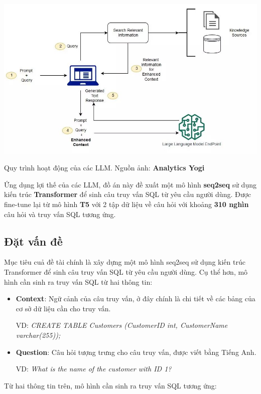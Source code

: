 \documentclass[a4paper, 10pt]{article}
\begin{document}
\begin{minipage}{\linewidth}
    \captionsetup{type=figure}
    \centering
    \includegraphics[width=14cm]{./llm.jpg}
    \caption{Quy trình hoạt động của các LLM. Nguồn ảnh: \textbf{Analytics Yogi}}
\end{minipage}

Ứng dụng lợi thế của các LLM, đồ án này đề xuất một mô hình \textbf{seq2seq} sử dụng kiến trúc \textbf{Transformer} để sinh câu truy vấn SQL từ yêu cầu người dùng.
Được fine-tune lại từ mô hình \textbf{T5} với 2 tập dữ liệu về câu hỏi với khoảng \textbf{310 nghìn} câu hỏi và truy vấn SQL tương ứng.

\newpage
\subsection{Đặt vấn đề}

Mục tiêu cuả đề tài chính là xây dựng một mô hình seq2seq sử dụng kiến trúc Transformer để sinh câu truy vấn SQL từ yêu cầu người dùng. Cụ thể hơn, mô hình cần sinh ra truy vấn SQL từ hai thông tin:
\begin{itemize}
    \item \textbf{Context}: Ngữ cảnh của câu truy vấn, ở đây chính là chi tiết về các bảng của cơ sở dữ liệu cần cho truy vấn. 
    
    VD: \textit{CREATE TABLE Customers (CustomerID int, CustomerName varchar(255));}
    \item \textbf{Question}: Câu hỏi tượng trưng cho câu truy vấn, được viết bằng Tiếng Anh.
    
    VD: \textit{What is the name of the customer with ID 1?}
\end{itemize}

Từ hai thông tin trên, mô hình cần sinh ra truy vấn SQL tương ứng:
\end{document}
